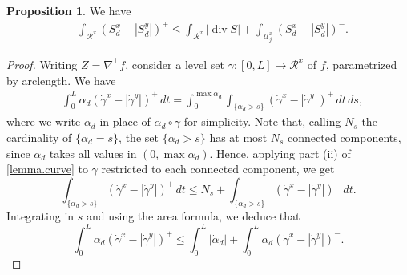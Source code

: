 \documentclass[11pt,a4paper]{amsart}
\theoremstyle{definition}
\newtheorem{proposition}[definition]{Proposition}
\DeclareMathOperator{\dive}{div}
\newcommand{\str}{\mathcal{U}}
\newcommand{\hau}{\mathcal{H}}
\begin{document}
\begin{proposition}\label{complement.bis}
	We have
	\begin{align*}
		&\int_{\mathcal{R}^x}(S_d^x-|S_d^y|)^+
		\le\int_{\mathcal{R}^x}\lvert \dive S\rvert+\int_{\str_j^x}(S_d^x-|S_d^y|)^-.
	\end{align*}
\end{proposition}

\begin{proof}
	Writing $Z=\nabla^\perp f$, consider a level set $\gamma:[0,L]\to\mathcal{R}^x$ of $f$, parametrized by arclength.
	We have
	\begin{align*}
		&\int_0^L\alpha_d(\dot\gamma^x-|\dot\gamma^y|)^+\,dt
		=\int_0^{\max\alpha_d}\int_{\{\alpha_d>s\}}(\dot\gamma^x-|\dot\gamma^y|)^+\,dt\,ds,
	\end{align*}
	where we write $\alpha_d$ in place of $\alpha_d\circ\gamma$ for simplicity.
	Note that, calling $N_s$ the cardinality of $\{\alpha_d=s\}$, the set $\{\alpha_d>s\}$
	has at most $N_s$ connected components, since $\alpha_d$
	takes all values in $(0,\max\alpha_d)$. Hence, applying part (ii) of
	\cref{lemma.curve} to $\gamma$ restricted to each connected component, we get
	$$\int_{\{\alpha_d>s\}}(\dot\gamma^x-|\dot\gamma^y|)^+\,dt
	\le N_s+\int_{\{\alpha_d>s\}}(\dot\gamma^x-|\dot\gamma^y|)^-\,dt.$$
	Integrating in $s$ and using the area formula, we deduce that
	$$\int_0^L\alpha_d(\dot\gamma^x-|\dot\gamma^y|)^+
	\le \int_0^L|\dot\alpha_d|+\int_0^L\alpha_d(\dot\gamma^x-|\dot\gamma^y|)^-.$$
    

\end{proof}
\end{document}
